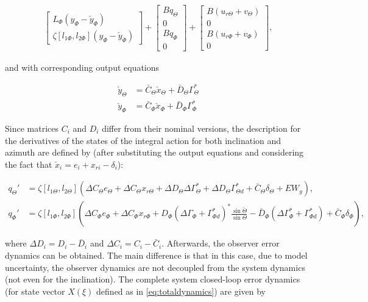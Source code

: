 \documentclass[main.tex]{subfiles}
\begin{document}
\begin{align}
\begin{bmatrix}
L_{\Phi}(y_{\Phi} - \check{y}_{\Phi}) \\
\zeta[l_{1\Phi},l_{2{\Phi}}](y_\Phi - \check{y}_\Phi)
\end{bmatrix} +
\begin{bmatrix}
Bq_\Theta \\
0 \\
Bq_\Phi \\
0	
\end{bmatrix} +
\begin{bmatrix}
B(u_{r\Theta} + v_\Theta)\\
0 \\
B(u_{r\Phi} + v_\Phi) \\
0
\end{bmatrix},
\end{align}

and with corresponding output equations

\begin{align}
	\check{y}_\Theta &= \bar{C}_\Theta \check{x}_\Theta + \bar{D}_\Theta \Gamma_\Theta^* \\
	\check{y}_\Phi &= \bar{C}_\Phi \check{x}_\Phi + \bar{D}_\Phi \Gamma_\Phi^*		
\end{align}
	
Since matrices $C_i$ and $D_i$ differ from their nominal versions, the description for the derivatives of the states of the integral action for both inclination and azimuth are defined by (after substituting the output equations and considering the fact that $\check{x}_i = e_i + x_{ri} - \delta_i$):

\begin{align}
	q_\Theta' &= \zeta[l_{1\Theta},l_{2\Theta}](\Delta C_\Theta e_\Theta + \Delta C_\Theta x_{r\Theta} + \Delta D_\Theta \Delta \Gamma_\Theta^*  + \Delta D_\Theta \Gamma_{\Theta d}^* + \bar{C}_\Theta \delta_\Theta + EW_y), \\
	q_\Phi' &= \zeta[l_{1\Phi},l_{2\Phi}](\Delta C_\Phi e_\Phi + \Delta C_\Phi x_{r\Phi} + D_\Phi (\Delta \Gamma_{\Phi} + \Gamma_{\Phi d}^*)^*\frac{\sin \check{\Theta}}{\sin \Theta} - \bar{D}_\Phi (\Delta \Gamma_\Phi^* + \Gamma_{\Phi d}^*)  + \bar{C}_\Phi \delta_\Phi),
\end{align}

where $\Delta D_i = D_i-\bar{D}_i$ and $\Delta C_i = C_i - \bar{C}_i$. Afterwards, the observer error dynamics can be obtained. The main difference is that in this case, due to model uncertainty, the observer dynamics are not decoupled from the system dynamics (not even for the inclination). The complete system closed-loop error dynamics (for state vector $X(\xi)$ defined as in \eqref{eq:totaldynamics}) are given by
\end{document}
